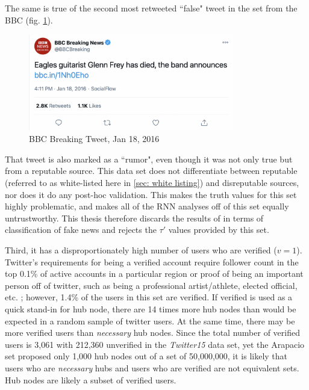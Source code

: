 \documentclass[preprint,review,12pt]{elsarticle}
\begin{document}
The same is true of the second most retweeted ``false" tweet in the set from the BBC (fig. \ref{fig:BBC Breaking Tweet, Jan 18, 2016}).
\begin{figure}[h!]
    \centering
    \includegraphics[width=9cm]{BBC Eagles.png}
    \caption{BBC Breaking Tweet, Jan 18, 2016 \cite{bbc2016tweet}}
    \label{fig:BBC Breaking Tweet, Jan 18, 2016}
\end{figure}
That tweet is also marked as a ``rumor", even though it was not only true but from a reputable source. This data set does not differentiate between reputable (referred to as white-listed here in \ref{sec: white listing}) and disreputable sources, nor does it do any post-hoc validation. This makes the truth values for this set highly problematic, and makes all of the RNN analyses off of this set equally untrustworthy. This thesis therefore discards the results of \citep{liu2018early,ma2017detect,ma2016detecting,khoo2020interpretable,liu2019early,huang2019deep} in terms of classification of fake news and rejects the $\tau'$ values provided by this set.

Third, it has a disproportionately high number of users who are verified ($v = 1$). Twitter's requirements for being a verified account require follower count in the top 0.1\% of active accounts in a particular region or proof of being an important person off of twitter, such as being a professional artist/athlete, elected official, etc. \citep{twitter2020verified}; however, 1.4\% of the users in this set are verified. If verified is used as a quick stand-in for hub node, there are 14 times more hub nodes than would be expected in a random sample of twitter users. At the same time, there may be more verified users than \textit{necessary} hub nodes. Since the total number of verified users is 3,061 with 212,360 unverified in the \textit{Twitter15} data set, yet the Arapacio set proposed only 1,000 hub nodes out of a set of 50,000,000, it is likely that users who are \textit{necessary} hubs and users who are verified are not equivalent sets. Hub nodes are likely a subset of verified users. 
\end{document}
